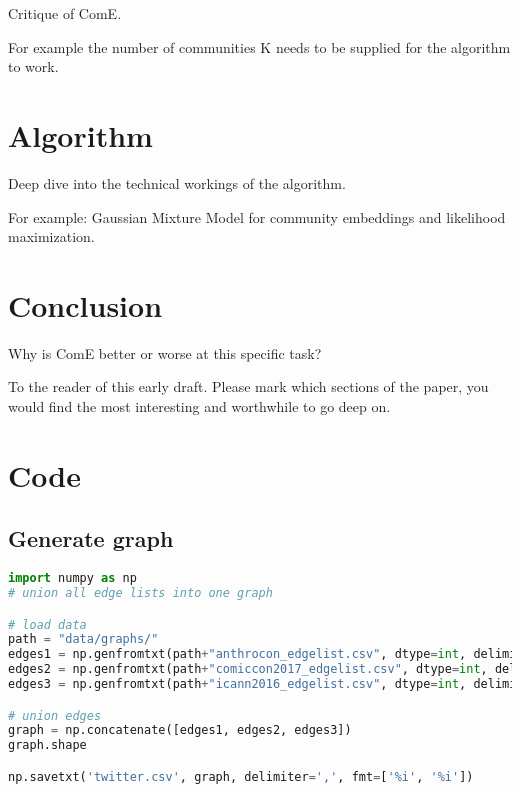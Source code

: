 \documentclass[sigconf, anonymous]{acmart}
\begin{document}
Critique of ComE.

For example the number of communities K needs to be supplied for the algorithm to work.

\section{Algorithm}

Deep dive into the technical workings of the algorithm.

For example: Gaussian Mixture Model for community embeddings and likelihood maximization.

\section{Conclusion}

Why is ComE better or worse at this specific task?






\begin{acks}
To the reader of this early draft. Please mark which sections of the paper, you would find the most interesting and worthwhile to go deep on.
\end{acks}


\appendix

\section{Code}

\subsection{Generate graph}

\begin{lstlisting}[language=python]
import numpy as np
# union all edge lists into one graph

# load data
path = "data/graphs/"
edges1 = np.genfromtxt(path+"anthrocon_edgelist.csv", dtype=int, delimiter=',')
edges2 = np.genfromtxt(path+"comiccon2017_edgelist.csv", dtype=int, delimiter=',')
edges3 = np.genfromtxt(path+"icann2016_edgelist.csv", dtype=int, delimiter=',')

# union edges
graph = np.concatenate([edges1, edges2, edges3])
graph.shape

np.savetxt('twitter.csv', graph, delimiter=',', fmt=['%i', '%i'])
\end{lstlisting}
\end{document}
